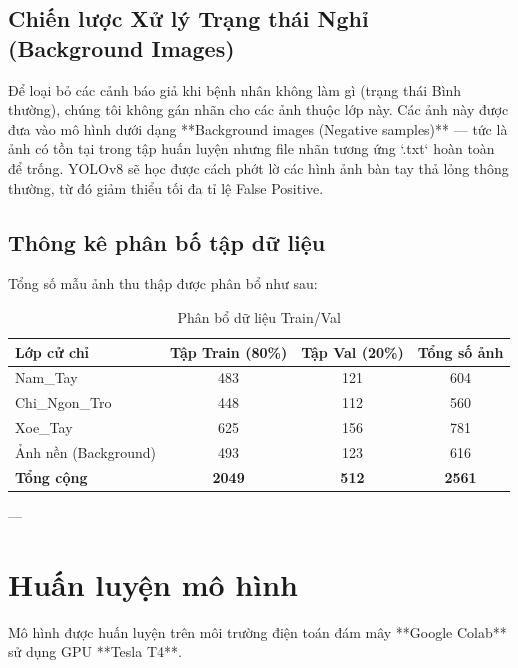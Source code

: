 \documentclass[12pt,a4paper]{article}
\begin{document}
\subsection{Chiến lược Xử lý Trạng thái Nghỉ (Background Images)}
Để loại bỏ các cảnh báo giả khi bệnh nhân không làm gì (trạng thái Bình thường), chúng tôi không gán nhãn cho các ảnh thuộc lớp này. Các ảnh này được đưa vào mô hình dưới dạng **Background images (Negative samples)** — tức là ảnh có tồn tại trong tập huấn luyện nhưng file nhãn tương ứng `.txt` hoàn toàn để trống. YOLOv8 sẽ học được cách phớt lờ các hình ảnh bàn tay thả lỏng thông thường, từ đó giảm thiểu tối đa tỉ lệ False Positive.

\subsection{Thông kê phân bố tập dữ liệu}
Tổng số mẫu ảnh thu thập được phân bổ như sau:
\begin{table}[H]
    \centering
    \caption{Phân bổ dữ liệu Train/Val}
    \begin{tabular}{lccc}
        \toprule
        \textbf{Lớp cử chỉ} & \textbf{Tập Train (80\%)} & \textbf{Tập Val (20\%)} & \textbf{Tổng số ảnh} \\
        \midrule
        Nam\_Tay & 483 & 121 & 604 \\
        Chi\_Ngon\_Tro & 448 & 112 & 560 \\
        Xoe\_Tay & 625 & 156 & 781 \\
        Ảnh nền (Background) & 493 & 123 & 616 \\
        \midrule
        \textbf{Tổng cộng} & \textbf{2049} & \textbf{512} & \textbf{2561} \\
        \bottomrule
    \end{tabular}
\end{table}

---

\section{Huấn luyện mô hình}
Mô hình được huấn luyện trên môi trường điện toán đám mây **Google Colab** sử dụng GPU **Tesla T4**.
\end{document}
